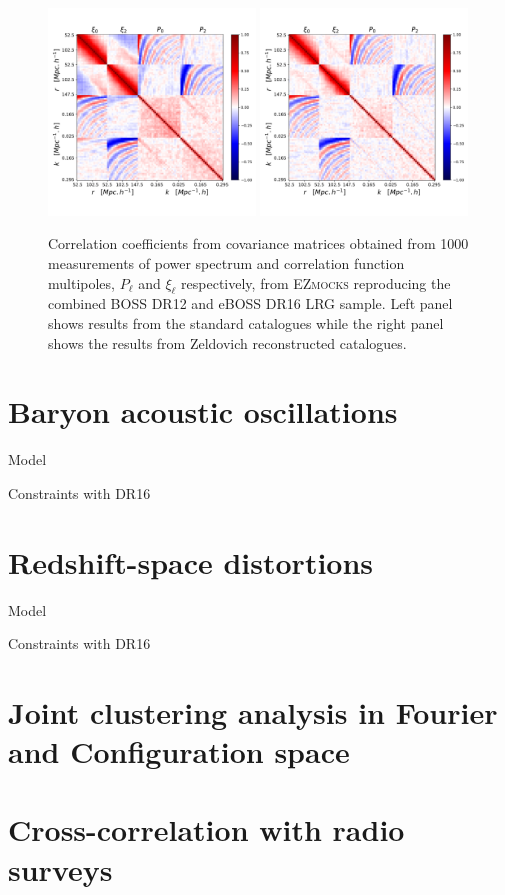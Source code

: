 \begin{figure}
    \centering 
    \includegraphics[width=0.49\textwidth]{fig/galaxies/covariance_prerecon.pdf}
    \includegraphics[width=0.49\textwidth]{fig/galaxies/covariance.pdf}
    \caption{Correlation coefficients from covariance matrices obtained from 1000 measurements
    of power spectrum and correlation function multipoles, $P_\ell$ and $\xi_\ell$ respectively,
    from \textsc{EZmocks} reproducing the combined BOSS DR12 and eBOSS DR16 LRG sample.
    Left panel shows results from the standard catalogues while the right panel 
    shows the results from Zeldovich reconstructed catalogues. 
    }
    \label{fig:covariance_ezmock}
\end{figure}

\section{Baryon acoustic oscillations}
\label{galaxies:bao}

Model 

Constraints with DR16 

\section{Redshift-space distortions}
\label{galaxies:rsd}

Model 

Constraints with DR16 

\section{Joint clustering analysis in Fourier and Configuration space}
\label{galaxies:joint}




\section{Cross-correlation with radio surveys}
\label{galaxies:radio}

\cite{wolzHIConstraintsCrosscorrelation2021}